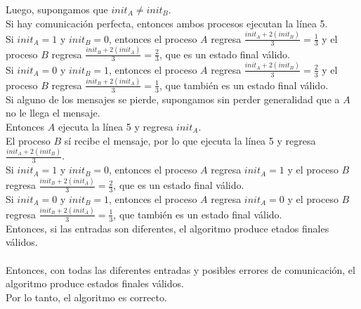 \documentclass[12pt,a4paper]{report}
\begin{document}
\begin{enumerate}
{	Luego, supongamos que $init_A \ne init_B$.\\
	Si hay comunicación perfecta, entonces ambos procesos ejecutan la línea 5.\\
	Si $init_A = 1$ y $init_B = 0$, entonces el proceso $A$ regresa
	$\frac{init_A + 2(init_B)}{3} = \frac{1}{3}$ y el proceso $B$ regresa
	$\frac{init_B + 2(init_A)}{3} = \frac{2}{3}$, que es un estado final válido.\\
	Si $init_A = 0$ y $init_B = 1$, entonces el proceso $A$ regresa
	$\frac{init_A + 2(init_B)}{3} = \frac{2}{3}$ y el proceso $B$ regresa
	$\frac{init_B + 2(init_A)}{3} = \frac{1}{3}$, que también es un estado final válido.\\
	Si alguno de los mensajes se pierde, supongamos sin perder generalidad que a $A$
	no le llega el mensaje.\\
	Entonces $A$ ejecuta la línea 5 y regresa $init_A$.\\
	El proceso $B$ sí recibe el mensaje, por lo que ejecuta la línea 5 y regresa
	$\frac{init_A + 2 (init_B)}{3}$.\\
	Si $init_A = 1$ y $init_B = 0$, entonces el proceso $A$ regresa $init_A = 1$
	y el proceso $B$ regresa $\frac{init_B + 2(init_A)}{3} = \frac{2}{3}$,
	que es un estado final válido.\\
	Si $init_A = 0$ y $init_B = 1$, entonces el proceso $A$ regresa $init_A = 0$
	y el proceso $B$ regresa $\frac{init_B + 2(init_A)}{3} = \frac{1}{3}$,
	que también es un estado final válido.\\
	Entonces, si las entradas son diferentes, el algoritmo produce etados finales
	válidos.\\\\
	Entonces, con todas las diferentes entradas y posibles errores de comunicación,
	el algoritmo produce estados finales válidos.\\
	Por lo tanto, el algoritmo es correcto.\\\\
	}
\end{enumerate}
\end{document}
